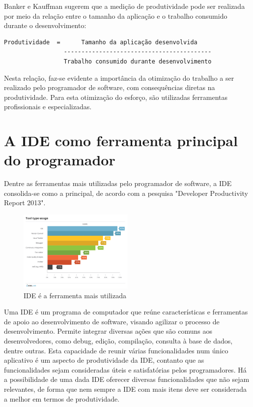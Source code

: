 \documentclass[12pt,journal,compsoc]{IEEEtran}
\begin{document}
Banker e Kauffman\cite{measuring_productivity} sugerem que a medição de produtividade pode ser realizada por meio da relação entre o tamanho da aplicação e o trabalho consumido durante o desenvolvimento:

\begingroup
\fontsize{7pt}{8pt}\selectfont
\begin{verbatim}
Produtividade  =      Tamanho da aplicação desenvolvida
                 ------------------------------------------
                 Trabalho consumido durante desenvolvimento
\end{verbatim}
\endgroup

Nesta relação, faz-se evidente a importância da otimização do trabalho a ser realizado pelo programador de software, com consequências diretas na produtividade. Para esta otimização do esforço, são utilizadas ferramentas profissionais e especializadas.

\section{A IDE como ferramenta principal do programador}

Dentre as ferramentas mais utilizadas pelo programador de software, a IDE consolida-se como a principal, de acordo com a pesquisa "Developer Productivity Report 2013"\cite{zero_turnaround_2013}.

\begin{figure}[ht!]
\centering
\includegraphics[width=0.5\textwidth]{img/16-tool-type-usage}
\caption{IDE é a ferramenta mais utilizada\cite{zero_turnaround_2013}}
\label{flow_before}
\end{figure}

Uma IDE é um programa de computador que reúne características e ferramentas de apoio ao desenvolvimento de software, visando agilizar o processo de desenvolvimento\cite{ide_definition}. Permite integrar diversas ações que são comuns aos desenvolvedores, como debug, edição, compilação, consulta à base de dados, dentre outras. Esta capacidade de reunir várias funcionalidades num único aplicativo é um aspecto de produtividade da IDE, contanto que as funcionalidades sejam consideradas úteis e satisfatórias pelos programadores. Há a possibilidade de uma dada IDE oferecer diversas funcionalidades que não sejam relevantes, de forma que nem sempre a IDE com mais itens deve ser considerada a melhor em termos de produtividade.
\end{document}
